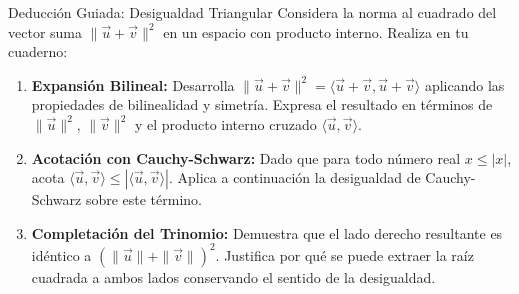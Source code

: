 \documentclass[10pt,aspectratio=169]{beamer}
\begin{document}
\begin{frame}{Deducción Guiada: Desigualdad Triangular}
  \vspace{0.05cm}
  Considera la norma al cuadrado del vector suma $\|\vec{u} + \vec{v}\|^2$ en un espacio con producto interno. Realiza en tu cuaderno:
  \vspace{0.22cm}
  \begin{enumerate}\itemsep10pt
    \item[(a)] \textbf{Expansión Bilineal:} Desarrolla $\|\vec{u}+\vec{v}\|^2 = \langle \vec{u}+\vec{v}, \vec{u}+\vec{v}\rangle$ aplicando las propiedades de bilinealidad y simetría. Expresa el resultado en términos de $\|\vec{u}\|^2$, $\|\vec{v}\|^2$ y el producto interno cruzado $\langle \vec{u}, \vec{v}\rangle$.
    \item[(b)] \textbf{Acotación con Cauchy-Schwarz:} Dado que para todo número real $x \le |x|$, acota $\langle \vec{u}, \vec{v}\rangle \le |\langle \vec{u}, \vec{v}\rangle|$. Aplica a continuación la desigualdad de Cauchy-Schwarz sobre este término.
    \item[(c)] \textbf{Completación del Trinomio:} Demuestra que el lado derecho resultante es idéntico a $(\|\vec{u}\| + \|\vec{v}\|)^2$. Justifica por qué se puede extraer la raíz cuadrada a ambos lados conservando el sentido de la desigualdad.
  \end{enumerate}
\end{frame}
\end{document}
